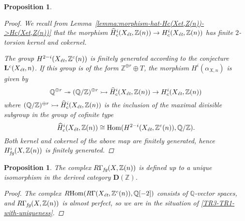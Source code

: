 \documentclass{article}
\DeclareMathOperator{\Hom}{Hom}
\newcommand{\QQ}{\mathbb{Q}}
\newcommand{\ZZ}{\mathbb{Z}}
\newcommand{\et}{\text{\it ét}}
\newcommand{\fg}{\text{\it fg}}
\newcommand{\RHom}{R\!\Hom}
\newtheorem{proposition}[theorem]{Proposition}
\theoremstyle{definition}
\numberwithin{equation}{section}
\begin{document}
\begin{proposition}
\begin{proof}
    We recall from Lemma~\ref{lemma:morphism-hat-Hc(Xet,Z(n))->Hc(Xet,Z(n))}
    that the morphism
    $\widehat{H}^i_c (X_\et, \ZZ (n)) \to H^i_c (X_\et, \ZZ (n))$ has finite
    $2$-torsion kernel and cokernel.

    The group $H^{2-i} (X_\et, \ZZ^c (n))$ is finitely generated
    according to the conjecture $\mathbf{L}^c (X_\et, n)$. If this
    group is of the form $\ZZ^{\oplus r}\oplus T$, the morphism
    $H^i (\alpha_{X,n})$ is given by
    $$\QQ^{\oplus r} \twoheadrightarrow (\QQ/\ZZ)^{\oplus r} \rightarrowtail \widehat{H}^i_c (X_\et, \ZZ (n)) \to H^i_c (X_\et, \ZZ (n))$$
    where
    $(\QQ/\ZZ)^{\oplus r} \rightarrowtail \widehat{H}^i_c (X_\et, \ZZ (n))$ is
    the inclusion of the maximal divisible subgroup in the group of cofinite
    type
    $$\widehat{H}^i_c (X_\et, \ZZ (n)) \cong \Hom (H^{2-i} (X_\et, \ZZ^c (n)), \QQ/\ZZ).$$
    Both kernel and cokernel of the above map are finitely generated, hence
    $H^i_\fg (X, \ZZ (n))$ is finitely generated.
  \end{proof}
\end{proposition}

\begin{proposition}
  \label{prop:RGamma-fg-uniquely-defined}
  The complex $R\Gamma_\fg (X, \ZZ (n))$ is defined up to a unique isomorphism
  in the derived category $\mathbf{D} (\ZZ)$.

  \begin{proof}
    The complex $\RHom (R\Gamma (X_\et, \ZZ^c (n)), \QQ [-2])$ consists of
    $\QQ$-vector spaces, and $R\Gamma_\fg (X, \ZZ (n))$ is almost perfect, so we
    are in the situation of \ref{TR3-TR1-with-uniqueness}.
  \end{proof}
\end{proposition}
\end{document}
